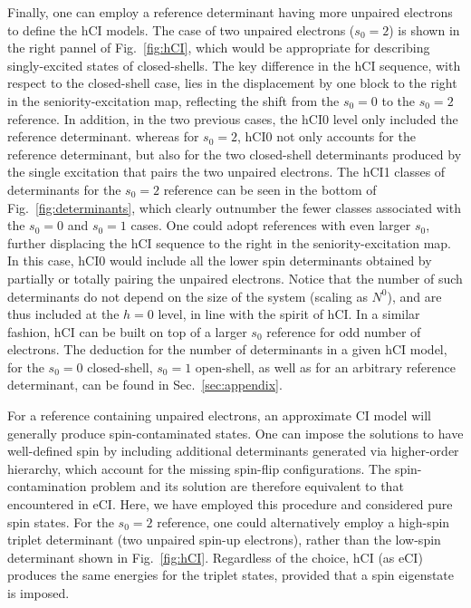 \documentclass[aip,jcp,reprint,noshowkeys,superscriptaddress]{revtex4-1}
\begin{document}
Finally, one can employ a reference determinant having more unpaired electrons to define the hCI models.
The case of two unpaired electrons ($s_0=2$) is shown in the right pannel of Fig.~\ref{fig:hCI},
which would be appropriate for describing singly-excited states of closed-shells.
The key difference in the hCI sequence, with respect to the closed-shell case, lies in the displacement by one block to the right in the seniority-excitation map,
reflecting the shift from the $s_0=0$ to the $s_0=2$ reference.
In addition, in the two previous cases, the hCI0 level only included the reference determinant.
whereas for $s_0=2$, hCI0 not only accounts for the reference determinant,
but also for the two closed-shell determinants produced by the single excitation that pairs the two unpaired electrons.
The hCI1 classes of determinants for the $s_0=2$ reference can be seen in the bottom of Fig.~\ref{fig:determinants},
which clearly outnumber the fewer classes associated with the $s_0=0$ and $s_0=1$ cases.
One could adopt references with even larger $s_0$, further displacing the hCI sequence to the right in the seniority-excitation map.
In this case, hCI0 would include all the lower spin determinants obtained by partially or totally pairing the unpaired electrons.
Notice that the number of such determinants do not depend on the size of the system (scaling as $N^0$), and are thus included at the $h=0$ level, in line with the spirit of hCI.
In a similar fashion, hCI can be built on top of a larger $s_0$ reference for odd number of electrons.
The deduction for the number of determinants in a given hCI model, for the $s_0=0$ closed-shell, $s_0=1$ open-shell, as well as for an arbitrary reference determinant,
can be found in Sec.~\ref{sec:appendix}.

For a reference containing unpaired electrons, an approximate CI model will generally produce spin-contaminated states.
One can impose the solutions to have well-defined spin by including additional determinants generated via higher-order hierarchy, which account for the missing spin-flip configurations.
The spin-contamination problem and its solution are therefore equivalent to that encountered in eCI. \cite{Maurice_1996}
Here, we have employed this procedure and considered pure spin states.
For the $s_0 = 2$ reference, one could alternatively employ a high-spin triplet determinant (two unpaired spin-up electrons), 
rather than the low-spin determinant shown in Fig.~\ref{fig:hCI}.
Regardless of the choice, hCI (as eCI) produces the same energies for the triplet states, provided that a spin eigenstate is imposed.
\end{document}
